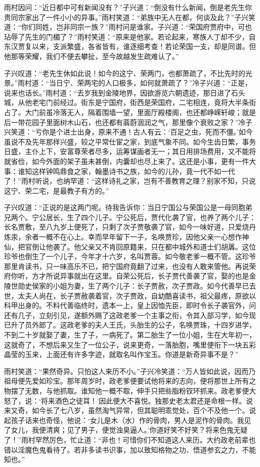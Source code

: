 \documentclass[12pt,oneside]{book}
\begin{document}
雨村因问：“近日都中可有新闻没有？”子兴道：“倒没有什么新闻，倒是老先生你贵同宗家出了一件小小的异事。”雨村笑道：“弟族中无人在都，何谈及此？”子兴笑道：“你们同姓，岂非同宗一族？”雨村问是谁家。子兴道：“荣国府贾府中，可也玷辱了先生的门楣了？”雨村笑道：“原来是他家。若论起来，寒族人丁却不少，自东汉贾复以来，支派繁盛，各省皆有，谁逐细考查！若论荣国一支，却是同谱。但他那等荣耀，我们不便去攀扯，至今故越发生疏难认了。”

子兴叹道：“老先生休如此说！如今的这宁、荣两门，也都萧疏了，不比先时的光景。”雨村道：“当日宁、荣两宅的人口极多，如何就萧疏了？”冷子兴道：“正是，说来也话长。”雨村道：“去岁我到金陵地界，因欲游览六朝遗迹，那日进了石头城，从他老宅门前经过。街东是宁国府，街西是荣国府，二宅相连，竟将大半条街占了。大门前虽冷落无人，隔着围墙一望，里面厅殿楼阁，也还都峥嵘轩峻；就是后一带花园子里面树木山石，也还都有蓊蔚洇润之气，那里像个衰败之家？”冷子兴笑道：“亏你是个进士出身，原来不通！古人有云：‘百足之虫，死而不僵。’如今虽说不及先年那样兴盛，较之平常仕宦之家，到底气象不同。如今生齿日繁，事务日盛，主仆上下，安富尊荣者尽多，运筹谋画者无一；其日用排场费用，又不能将就省俭，如今外面的架子虽未甚倒，内囊却也尽上来了。这还是小事，更有一件大事：谁知这样钟鸣鼎食之家，翰墨诗书之族，如今的儿孙，竟一代不如一代了！”雨村听说，也纳罕道：“这样诗礼之家，岂有不善教育之理？别家不知，只说这宁、荣二宅，是最教子有方的。”

子兴叹道：“正说的是这两门呢。待我告诉你：当日宁国公与荣国公是一母同胞弟兄两个。宁公居长，生了四个儿子。宁公死后，贾代化袭了官，也养了两个儿子：长名贾敷，至八九岁上便死了，只剩了次子贾敬袭了官，如今一味好道，只爱烧丹炼汞，余者一概不在心上。幸而早年留下一子，名唤贾珍，因他父亲一心想作神仙，把官倒让他袭了。他父亲又不肯回原籍来，只在都中城外和道士们胡羼。这位珍爷也倒生了一个儿子，今年才十六岁，名叫贾蓉。如今敬老爹一概不管。这珍爷那里肯读书，只一味高乐不已，把宁国府竟翻了过来，也没有人敢来管他。再说荣府你听，方才所说异事就出在这里。自荣公死后，长子贾代善袭了官，娶的也是金陵世勋史侯家的小姐为妻，生了两个儿子：长子贾赦，次子贾政。如今代善早已去世，太夫人尚在，长子贾赦袭着官，次子贾政，自幼酷喜读书，祖父最疼，原欲以科甲出身的。不料代善临终时，遗本一上，皇上因恤先臣，即时令长子袭官外，问还有几子，立刻引见，遂额外赐了这政老爹一个主事之衔，令其入部习学，如今现已升了员外郎了。这政老爹的夫人王氏，头胎生的公子，名唤贾珠，十四岁进学，不到二十岁就娶了妻，生了子，一病死了。第二胎生了一位小姐，生在大年初一，这就奇了，不想后来又生了一位公子，说来更奇，一落胎胞，嘴里便衔下一块五彩晶莹的玉来，上面还有许多字迹，就取名叫作宝玉。你道是新奇异事不是？”

雨村笑道：“果然奇异。只怕这人来历不小。”子兴冷笑道：“万人皆如此说，因而乃祖母便先爱如珍宝。那年周岁时，政老爹便要试他将来的志向，便将那世上所有之物摆了无数，与他抓取。谁知他一概不取，伸手只把些脂粉钗环抓来。政老爹便大怒了，说：‘将来酒色之徒耳！’因此便大不喜悦。独那史老太君还是命根一样。说来又奇，如今长了七八岁，虽然淘气异常，但其聪明乖觉处，百个不及他一个。说起孩子话来也奇怪，他说：‘女儿是木（水）作的骨肉，男人是泥作的骨肉。我见了女儿，我便清爽；见了男子，便觉浊臭逼人。’你道好笑不好笑？将来色鬼无疑了！”雨村罕然厉色，忙止道：“非也！可惜你们不知道这人来历。大约政老前辈也错以淫魔色鬼看待了。若非多读书识事，加以致知格物之功、悟道参玄之力，不能知也。”
\end{document}
